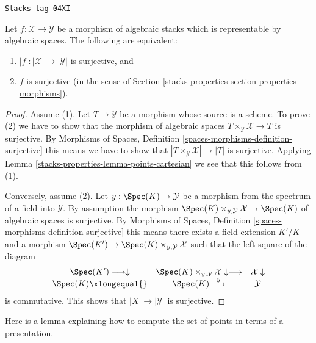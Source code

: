 \begin{lemma}
\label{stacks-properties-lemma-characterize-surjective}
\href{https://stacks.math.columbia.edu/tag/04XI}{\texttt{Stacks tag 04XI}}

Let $f : \mathcal{X} \to \mathcal{Y}$ be a morphism of algebraic stacks
which is representable by algebraic spaces. The following are equivalent:
\begin{enumerate}
\item $|f| : |\mathcal{X}| \to |\mathcal{Y}|$ is surjective, and
\item $f$ is surjective
(in the sense of Section \ref{stacks-properties-section-properties-morphisms}).
\end{enumerate}
\end{lemma}

\begin{proof}
Assume (1). Let $T \to \mathcal{Y}$ be a morphism whose source is a scheme.
To prove (2) we have to show that the morphism of algebraic spaces
$T \times_\mathcal{Y} \mathcal{X} \to T$ is surjective. By
Morphisms of Spaces, Definition \ref{spaces-morphisms-definition-surjective}
this means we have to show that
$|T \times_\mathcal{Y} \mathcal{X}| \to |T|$ is surjective.
Applying
Lemma \ref{stacks-properties-lemma-points-cartesian}
we see that this follows from (1).

\medskip\noindent
Conversely, assume (2). Let $y : \Spec(K) \to \mathcal{Y}$ be a
morphism from the spectrum of a field into $\mathcal{Y}$. By assumption the
morphism
$\Spec(K) \times_{y, \mathcal{Y}} \mathcal{X} \to \Spec(K)$
of algebraic spaces is surjective. By
Morphisms of Spaces, Definition \ref{spaces-morphisms-definition-surjective}
this means there exists a field extension
$K'/K$ and a morphism
$\Spec(K') \to \Spec(K) \times_{y, \mathcal{Y}} \mathcal{X}$
such that the left square of the diagram
$$
\begin{array}{ccc}\Spec(K') \longrightarrow\downarrow & \Spec(K) \times_{y, \mathcal{Y}} \mathcal{X} \downarrow\longrightarrow & \mathcal{X} \downarrow \\ \Spec(K) \xlongequal{} & \Spec(K) \overset{y}{\longrightarrow} & \mathcal{Y}\end{array}
$$
is commutative. This shows that $|X| \to |\mathcal{Y}|$ is surjective.
\end{proof}

Here is a lemma explaining how to compute the set of points in terms
of a presentation.

